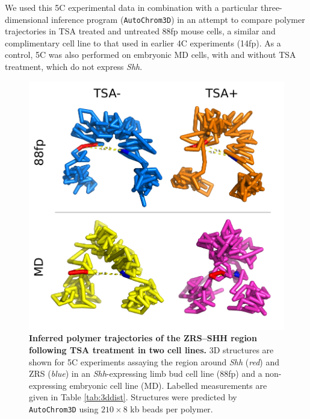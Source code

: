 \documentclass[a4paper,11pt,oneside]{book}
\begin{document}
We used this 5C experimental data in combination with a particular three-dimensional inference program  (\texttt{AutoChrom3D}\cite{Peng2013}) in an attempt to compare polymer trajectories in TSA treated and untreated 88fp mouse cells, a similar and complimentary cell line to that used in earlier 4C experiments (14fp). As a control, 5C was also performed on embryonic MD cells, with and without TSA treatment, which do not express \emph{Shh}.

\begin{figure}
\begin{center} 
\includegraphics[width=5.45in]{figs/5c3d.pdf}
\captionsetup{width=\textwidth} 
\caption[ Inferred polymer trajectories of the ZRS--SHH region following TSA treatment in two cell lines. ]{ {\bf Inferred polymer trajectories of the ZRS--SHH region following TSA treatment in two cell lines. }
3D structures are shown for 5C experiments assaying the region around \emph{Shh} (\emph{red}) and ZRS (\emph{blue}) in an \emph{Shh}-expressing limb bud cell line (88fp) and a non-expressing embryonic cell line (MD). Labelled measurements are given in Table \ref{tab:3ddist}. Structures were predicted by \texttt{AutoChrom3D}\cite{Peng2013} using $210 \times 8$ kb beads per polymer.
}\label{fig:5c3d}
\end{center} 
\end{figure} 
\end{document}
